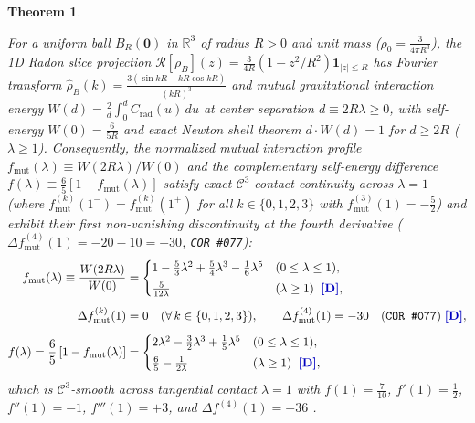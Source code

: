 \documentclass[11pt,a4paper]{article}
\newcommand{\catD}{\text{\textbf{\textcolor{blue!75!black}{[D]}}}}
\theoremstyle{definition}
\theoremstyle{plain}
\newtheorem{theorem}[axiom]{Theorem}
\theoremstyle{remark}
\begin{document}
\begin{theorem}
\begin{enumerate}[label=(\roman*)]
  For a uniform ball $B_R(\mathbf{0})$ in $\mathbb{R}^3$ of radius $R > 0$ and unit mass ($\rho_0 = \frac{3}{4\pi R^3}$), the 1D Radon slice projection $\mathcal{R}[\rho_B](z) = \frac{3}{4R}(1 - z^2/R^2)\mathbf{1}_{|z|\le R}$ has Fourier transform $\hat{\rho}_B(k) = \frac{3(\sin kR - kR\cos kR)}{(kR)^3}$ and mutual gravitational interaction energy $W(d) = \frac{2}{d}\int_0^d C_{\mathrm{rad}}(u)\,du$ at center separation $d \equiv 2R\lambda \ge 0$, with self-energy $W(0) = \frac{6}{5R}$ and exact Newton shell theorem $d\cdot W(d) = 1$ for $d \ge 2R$ ($\lambda \ge 1$). Consequently, the normalized mutual interaction profile $f_{\mathrm{mut}}(\lambda) \equiv W(2R\lambda)/W(0)$ and the complementary self-energy difference $f(\lambda) \equiv \frac{6}{5}[1 - f_{\mathrm{mut}}(\lambda)]$ satisfy exact $\mathcal{C}^3$ contact continuity across $\lambda = 1$ (where $f_{\mathrm{mut}}^{(k)}(1^-) = f_{\mathrm{mut}}^{(k)}(1^+)$ for all $k \in \{0, 1, 2, 3\}$ with $f_{\mathrm{mut}}^{(3)}(1) = -\frac{5}{2}$) and exhibit their first non-vanishing discontinuity at the fourth derivative ($\Delta f_{\mathrm{mut}}^{(4)}(1) = -20 - 10 = -30$, \texttt{COR~\#077}):
  \begin{align}
  f_{\mathrm{mut}}(\lambda) \equiv \frac{W(2R\lambda)}{W(0)} &= \begin{cases}
  1 - \frac{5}{3}\lambda^2 + \frac{5}{4}\lambda^3 - \frac{1}{6}\lambda^5 & (0 \le \lambda \le 1), \\[3pt]
  \frac{5}{12\lambda} & (\lambda \ge 1) \;\;\catD,
  \end{cases} \nonumber \\[4pt]
  \Delta f_{\mathrm{mut}}^{(k)}(1) &= 0 \quad (\forall\,k \in \{0, 1, 2, 3\}), \qquad
  \Delta f_{\mathrm{mut}}^{(4)}(1) = -30 \quad \textnormal{(\texttt{COR~\#077})} \;\catD, \nonumber \\[4pt]
  f(\lambda) = \frac{6}{5}\left[1 - f_{\mathrm{mut}}(\lambda)\right]
  &= \begin{cases}
  2\lambda^2 - \frac{3}{2}\lambda^3 + \frac{1}{5}\lambda^5 & (0 \le \lambda \le 1), \\[3pt]
  \frac{6}{5} - \frac{1}{2\lambda} & (\lambda \ge 1) \;\;\catD,
  \end{cases} \label{eq:c4_ball_overlap_quintic}
  \end{align}
  which is $\mathcal{C}^3$-smooth across tangential contact $\lambda = 1$ with $f(1) = \frac{7}{10}$, $f'(1) = \frac{1}{2}$, $f''(1) = -1$, $f'''(1) = +3$, and $\Delta f^{(4)}(1) = +36$ \catD.
\end{enumerate}
\end{theorem}
\end{document}
